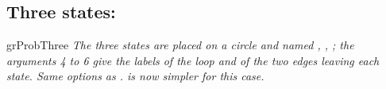 \subsection{Three states: }
\begin{NewMacroBox}{grProbThree}{}
\emph{The three states are placed on a circle and named ,
, ; the arguments 4 to 6 give the labels of the
loop and of the two edges leaving each state. Same options as
.  is now simpler for this case.}
\end{NewMacroBox}

\begin{tkzexample}[latex=7cm,small]
\end{tkzexample}

\endinput
